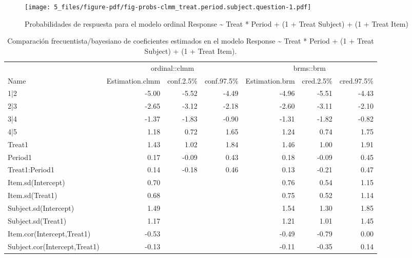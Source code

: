 \documentclass[
  12pt,
  a4paper,
  extrafontsizes,
  onecolumn,
  openright,
  table]{memoir}
\begin{document}
\begin{figure}[h]

{\centering \texttt{[image: 5\_files/figure-pdf/fig-probs-clmm\_treat.period.subject.question-1.pdf]}

}

\caption[Probabilidades de respuesta para el modelo ordinal
seleccionado.]{\label{fig-probs-clmm_treat.period.subject.question}Probabilidades
de respuesta para el modelo ordinal Response \textasciitilde{} Treat *
Period + (1 + Treat \textbar{} Subject) + (1 + Treat \textbar{} Item)}

\end{figure}

\tiny

\hypertarget{tbl-model-comp}{}
\begin{longtable}{lrrrrrr}
\caption{\label{tbl-model-comp}Comparación frecuentista/bayesiano de coeficientes estimados en el
modelo Response \textasciitilde{} Treat * Period + (1 + Treat \textbar{}
Subject) + (1 + Treat \textbar{} Item). }\tabularnewline

\toprule
 & \multicolumn{3}{c}{ordinal::clmm} & \multicolumn{3}{c}{brms::brm} \\ 
\cmidrule(lr){2-4} \cmidrule(lr){5-7}
Name & Estimation.clmm & conf.2.5\% & conf.97.5\% & Estimation.brm & cred.2.5\% & cred.97.5\% \\ 
\midrule
1|2 & -5.00 & -5.52 & -4.49 & -4.96 & -5.51 & -4.43 \\ 
2|3 & -2.65 & -3.12 & -2.18 & -2.60 & -3.11 & -2.10 \\ 
3|4 & -1.37 & -1.83 & -0.90 & -1.31 & -1.82 & -0.82 \\ 
4|5 & 1.18 & 0.72 & 1.65 & 1.24 & 0.74 & 1.75 \\ 
Treat1 & 1.43 & 1.02 & 1.84 & 1.46 & 1.00 & 1.91 \\ 
Period1 & 0.17 & -0.09 & 0.43 & 0.18 & -0.09 & 0.45 \\ 
Treat1:Period1 & 0.14 & -0.18 & 0.46 & 0.13 & -0.21 & 0.47 \\ 
Item.sd(Intercept) & 0.70 &  &  & 0.76 & 0.54 & 1.15 \\ 
Item.sd(Treat1) & 0.68 &  &  & 0.75 & 0.52 & 1.14 \\ 
Subject.sd(Intercept) & 1.49 &  &  & 1.54 & 1.30 & 1.85 \\ 
Subject.sd(Treat1) & 1.17 &  &  & 1.21 & 1.01 & 1.45 \\ 
Item.cor(Intercept,Treat1) & -0.53 &  &  & -0.49 & -0.79 & 0.00 \\ 
Subject.cor(Intercept,Treat1) & -0.13 &  &  & -0.11 & -0.35 & 0.14 \\ 
\bottomrule
\end{longtable}
\end{document}

